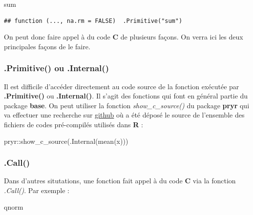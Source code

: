 \documentclass[
]{book}
\newenvironment{Shaded}{\begin{snugshade}}{\end{snugshade}}
\newcommand{\FunctionTok}[1]{\textcolor[rgb]{0.00,0.00,0.00}{#1}}
\newcommand{\NormalTok}[1]{#1}
\newcommand{\SpecialCharTok}[1]{\textcolor[rgb]{0.00,0.00,0.00}{#1}}
\theoremstyle{definition}
\theoremstyle{definition}
\theoremstyle{definition}
\theoremstyle{definition}
\theoremstyle{remark}
\begin{document}
\begin{Shaded}
\begin{Highlighting}[]
\NormalTok{sum}
\end{Highlighting}
\end{Shaded}

\begin{verbatim}
## function (..., na.rm = FALSE)  .Primitive("sum")
\end{verbatim}

On peut donc faire appel à du code \textbf{C} de plusieurs façons. On verra ici les deux principales façons de le faire.

\hypertarget{primitive-ou-.internal}{%
\subsubsection{\texorpdfstring{\textbf{.Primitive()} ou \textbf{.Internal()}}{.Primitive() ou .Internal()}}\label{primitive-ou-.internal}}

Il est difficile d'accéder directement au code source de la fonction exécutée par \textbf{.Primitive()} ou \textbf{.Internal()}. Il s'agit des fonctions qui font en général partie du package \textbf{base}. On peut utiliser la fonction \emph{show\_c\_source()} du package \textbf{pryr} qui va effectuer une recherche sur \href{https://github.com}{github} où a été déposé le source de l'ensemble des fichiers de codes pré-compilés utilisés dans \textbf{R} :

\begin{Shaded}
\begin{Highlighting}[]
\NormalTok{pryr}\SpecialCharTok{::}\FunctionTok{show\_c\_source}\NormalTok{(}\FunctionTok{.Internal}\NormalTok{(}\FunctionTok{mean}\NormalTok{(x)))}
\end{Highlighting}
\end{Shaded}

\hypertarget{call}{%
\subsubsection{\texorpdfstring{\textbf{.Call()}}{.Call()}}\label{call}}

Dans d'autres situtations, une fonction fait appel à du code \textbf{C} via la fonction \emph{.Call()}. Par exemple :

\begin{Shaded}
\begin{Highlighting}[]
\NormalTok{qnorm}
\end{Highlighting}
\end{Shaded}
\end{document}
